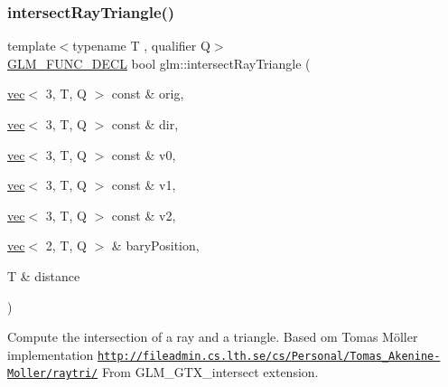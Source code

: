 \subsubsection{\texorpdfstring{intersect\+Ray\+Triangle()}{intersectRayTriangle()}}
{\footnotesize\ttfamily template$<$typename T , qualifier Q$>$ \\
\hyperlink{setup_8hpp_ab2d052de21a70539923e9bcbf6e83a51}{G\+L\+M\+\_\+\+F\+U\+N\+C\+\_\+\+D\+E\+CL} bool glm\+::intersect\+Ray\+Triangle (\begin{DoxyParamCaption}\item[{\hyperlink{structglm_1_1vec}{vec}$<$ 3, T, Q $>$ const \&}]{orig,  }\item[{\hyperlink{structglm_1_1vec}{vec}$<$ 3, T, Q $>$ const \&}]{dir,  }\item[{\hyperlink{structglm_1_1vec}{vec}$<$ 3, T, Q $>$ const \&}]{v0,  }\item[{\hyperlink{structglm_1_1vec}{vec}$<$ 3, T, Q $>$ const \&}]{v1,  }\item[{\hyperlink{structglm_1_1vec}{vec}$<$ 3, T, Q $>$ const \&}]{v2,  }\item[{\hyperlink{structglm_1_1vec}{vec}$<$ 2, T, Q $>$ \&}]{bary\+Position,  }\item[{T \&}]{distance }\end{DoxyParamCaption})}

Compute the intersection of a ray and a triangle. Based om Tomas Möller implementation \href{http://fileadmin.cs.lth.se/cs/Personal/Tomas_Akenine-Moller/raytri/}{\tt http\+://fileadmin.\+cs.\+lth.\+se/cs/\+Personal/\+Tomas\+\_\+\+Akenine-\/\+Moller/raytri/} From G\+L\+M\+\_\+\+G\+T\+X\+\_\+intersect extension. 
